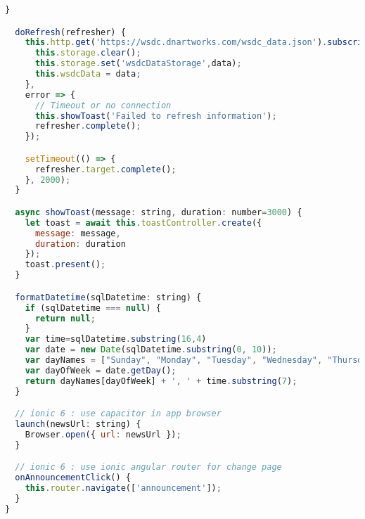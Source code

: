 \begin{lstlisting}[language=JavaScript, label={lst:home.page.ts}, caption=home.page.ts]
  }

  doRefresh(refresher) {
    this.http.get('https://wsdc.dnartworks.com/wsdc_data.json').subscribe((data: any) => {
      this.storage.clear();
      this.storage.set('wsdcDataStorage',data);
      this.wsdcData = data;
    },
    error => {
      // Timeout or no connection
      this.showToast('Failed to refresh information');
      refresher.complete();
    });

    setTimeout(() => {
      refresher.target.complete();
    }, 2000);
  }

  async showToast(message: string, duration: number=3000) {
    let toast = await this.toastController.create({
      message: message,
      duration: duration
    });
    toast.present();
  }

  formatDatetime(sqlDatetime: string) {
    if (sqlDatetime === null) {
      return null;
    }
    var time=sqlDatetime.substring(16,4)
    var date = new Date(sqlDatetime.substring(0, 10));
    var dayNames = ["Sunday", "Monday", "Tuesday", "Wednesday", "Thursday", "Friday", "Saturday"];
    var dayOfWeek = date.getDay();
    return dayNames[dayOfWeek] + ', ' + time.substring(7);
  }

  // ionic 6 : use capacitor in app browser
  launch(newsUrl: string) {
    Browser.open({ url: newsUrl });
  }

  // ionic 6 : use ionic angular router for change page
  onAnnouncementClick() {
    this.router.navigate(['announcement']);
  }
}

\end{lstlisting} 

